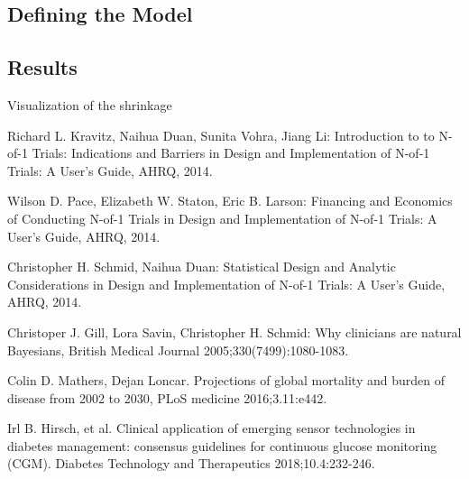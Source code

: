 \documentclass[12pt,a4paper,leqno]{report}
\theoremstyle{plain}
\theoremstyle{definition}
\theoremstyle{remark}
\begin{document}
\subsection{Defining the Model}\label{hiermodel}

\subsection{Results}\label{hierresults}

Visualization of the shrinkage


\begin{thebibliography}{4}

    Richard L. Kravitz, Naihua Duan, Sunita Vohra, Jiang Li: Introduction to to N-of-1 Trials: Indications and Barriers in Design and Implementation of N-of-1 Trials: A User's Guide, AHRQ, 2014.

    Wilson D. Pace, Elizabeth W. Staton, Eric B. Larson: Financing and Economics of Conducting N-of-1 Trials in Design and Implementation of N-of-1 Trials: A User's Guide, AHRQ, 2014.

    Christopher H. Schmid, Naihua Duan: Statistical Design and Analytic Considerations in Design and Implementation of N-of-1 Trials: A User's Guide, AHRQ, 2014.

    Christoper J. Gill, Lora Savin, Christopher H. Schmid: Why clinicians are natural Bayesians, British Medical Journal 2005;330(7499):1080-1083.

    Colin D. Mathers, Dejan Loncar. Projections of global mortality and burden of disease from 2002 to 2030, PLoS medicine 2016;3.11:e442.

    Irl B. Hirsch, et al. Clinical application of emerging sensor technologies in diabetes management: consensus guidelines for continuous glucose monitoring (CGM). Diabetes Technology and Therapeutics 2018;10.4:232-246.

\end{thebibliography}
\end{document}
